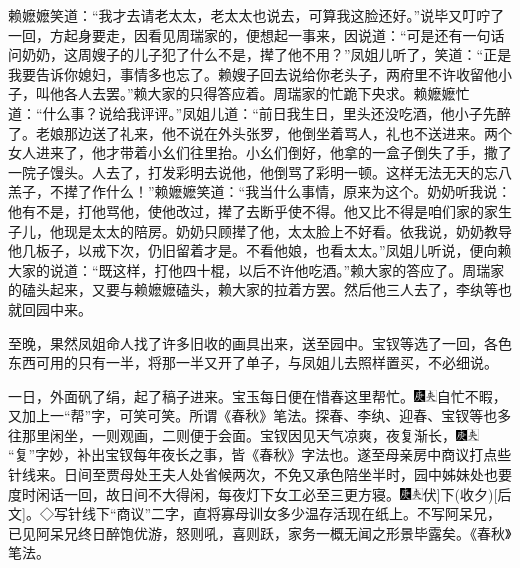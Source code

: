 赖嬷嬷笑道：``我才去请老太太，老太太也说去，可算我这脸还好。''说毕又叮咛了一回，方起身要走，因看见周瑞家的，便想起一事来，因说道：``可是还有一句话问奶奶，这周嫂子的儿子犯了什么不是，撵了他不用？''凤姐儿听了，笑道：``正是我要告诉你媳妇，事情多也忘了。赖嫂子回去说给你老头子，两府里不许收留他小子，叫他各人去罢。''赖大家的只得答应着。周瑞家的忙跪下央求。赖嬷嬷忙道：``什么事？说给我评评。''凤姐儿道：``前日我生日，里头还没吃酒，他小子先醉了。老娘那边送了礼来，他不说在外头张罗，他倒坐着骂人，礼也不送进来。两个女人进来了，他才带着小幺们往里抬。小幺们倒好，他拿的一盒子倒失了手，撒了一院子馒头。人去了，打发彩明去说他，他倒骂了彩明一顿。这样无法无天的忘八羔子，不撵了作什么！''赖嬷嬷笑道：``我当什么事情，原来为这个。奶奶听我说：他有不是，打他骂他，使他改过，撵了去断乎使不得。他又比不得是咱们家的家生子儿，他现是太太的陪房。奶奶只顾撵了他，太太脸上不好看。依我说，奶奶教导他几板子，以戒下次，仍旧留着才是。不看他娘，也看太太。''凤姐儿听说，便向赖大家的说道：``既这样，打他四十棍，以后不许他吃酒。''赖大家的答应了。周瑞家的磕头起来，又要与赖嬷嬷磕头，赖大家的拉着方罢。然后他三人去了，李纨等也就回园中来。

至晚，果然凤姐命人找了许多旧收的画具出来，送至园中。宝钗等选了一回，各色东西可用的只有一半，将那一半又开了单子，与凤姐儿去照样置买，不必细说。

一日，外面矾了绢，起了稿子进来。宝玉每日便在惜春这里帮忙。{\includegraphics[width=3mm]{../Images/00004}\includegraphics[width=3mm]{../Images/00012}\footnotesize \kaishu 自忙不暇，又加上一``帮''字，可笑可笑。所谓《春秋》笔法。}探春、李纨、迎春、宝钗等也多往那里闲坐，一则观画，二则便于会面。宝钗因见天气凉爽，夜复渐长，{\includegraphics[width=3mm]{../Images/00004}\includegraphics[width=3mm]{../Images/00012}\footnotesize \kaishu ``复''字妙，补出宝钗每年夜长之事，皆《春秋》字法也。}遂至母亲房中商议打点些针线来。日间至贾母处王夫人处省候两次，不免又承色陪坐半时，园中姊妹处也要度时闲话一回，故日间不大得闲，每夜灯下女工必至三更方寝。{\includegraphics[width=3mm]{../Images/00004}\includegraphics[width=3mm]{../Images/00012}\footnotesize \kaishu {(代)}{[}伏{]}下{(收夕)}{[}后文{]}。◇写针线下``商议''二字，直将寡母训女多少温存活现在纸上。不写阿呆兄，已见阿呆兄终日醉饱优游，怒则吼，喜则跃，家务一概无闻之形景毕露矣。《春秋》笔法。}

